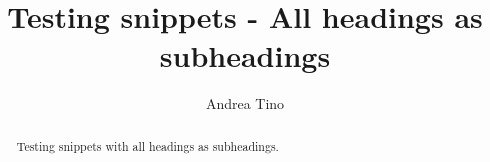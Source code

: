 \documentclass{article}
\begin{document}
\title{Testing snippets - All headings as subheadings}
\author{Andrea Tino}

\maketitle

\begin{abstract}
Testing snippets with all headings as subheadings.
\end{abstract}




\end{document}
